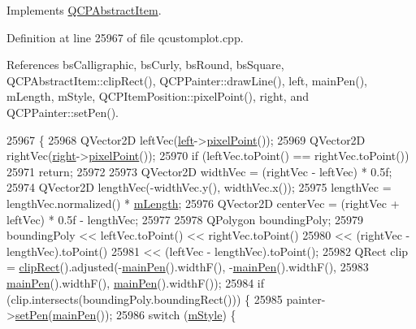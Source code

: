 Implements \hyperlink{class_q_c_p_abstract_item_ad0dc056f650c3ca73414e6b4f01674ef}{Q\+C\+P\+Abstract\+Item}.



Definition at line 25967 of file qcustomplot.\+cpp.



References bs\+Calligraphic, bs\+Curly, bs\+Round, bs\+Square, Q\+C\+P\+Abstract\+Item\+::clip\+Rect(), Q\+C\+P\+Painter\+::draw\+Line(), left, main\+Pen(), m\+Length, m\+Style, Q\+C\+P\+Item\+Position\+::pixel\+Point(), right, and Q\+C\+P\+Painter\+::set\+Pen().


\begin{DoxyCode}
25967                                              \{
25968   QVector2D leftVec(\hyperlink{class_q_c_p_item_bracket_af6cc6d27d96171778c6927d6edce48b0}{left}->\hyperlink{class_q_c_p_item_position_ae490f9c76ee2ba33752c495d3b6e8fb5}{pixelPoint}());
25969   QVector2D rightVec(\hyperlink{class_q_c_p_item_bracket_afa6c1360b05a50c4e0df37b3cebab6be}{right}->\hyperlink{class_q_c_p_item_position_ae490f9c76ee2ba33752c495d3b6e8fb5}{pixelPoint}());
25970   \textcolor{keywordflow}{if} (leftVec.toPoint() == rightVec.toPoint())
25971     \textcolor{keywordflow}{return};
25972 
25973   QVector2D widthVec = (rightVec - leftVec) * 0.5f;
25974   QVector2D lengthVec(-widthVec.y(), widthVec.x());
25975   lengthVec = lengthVec.normalized() * \hyperlink{class_q_c_p_item_bracket_ab3d99bba8da18eb4d0e0cb23dded33b2}{mLength};
25976   QVector2D centerVec = (rightVec + leftVec) * 0.5f - lengthVec;
25977 
25978   QPolygon boundingPoly;
25979   boundingPoly << leftVec.toPoint() << rightVec.toPoint()
25980                << (rightVec - lengthVec).toPoint()
25981                << (leftVec - lengthVec).toPoint();
25982   QRect clip = \hyperlink{class_q_c_p_abstract_item_a538e25ff8856534582f5b2b400a46405}{clipRect}().adjusted(-\hyperlink{class_q_c_p_item_bracket_a8df4ad873bf88a4a7bfb9bbbd490e495}{mainPen}().widthF(), -\hyperlink{class_q_c_p_item_bracket_a8df4ad873bf88a4a7bfb9bbbd490e495}{mainPen}().widthF(),
25983                                    \hyperlink{class_q_c_p_item_bracket_a8df4ad873bf88a4a7bfb9bbbd490e495}{mainPen}().widthF(), \hyperlink{class_q_c_p_item_bracket_a8df4ad873bf88a4a7bfb9bbbd490e495}{mainPen}().widthF());
25984   \textcolor{keywordflow}{if} (clip.intersects(boundingPoly.boundingRect())) \{
25985     painter->\hyperlink{class_q_c_p_painter_af9c7a4cd1791403901f8c5b82a150195}{setPen}(\hyperlink{class_q_c_p_item_bracket_a8df4ad873bf88a4a7bfb9bbbd490e495}{mainPen}());
25986     \textcolor{keywordflow}{switch} (\hyperlink{class_q_c_p_item_bracket_ac911907184c824d621f274f8e0990080}{mStyle}) \{

\end{DoxyCode}
